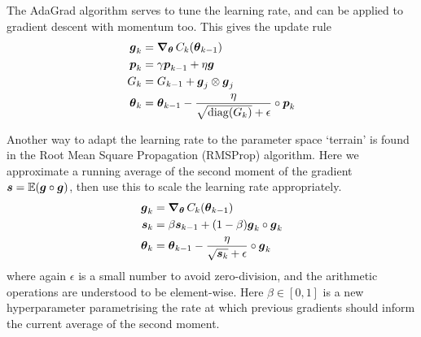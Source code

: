         The AdaGrad algorithm serves to tune the learning rate, and can be applied to gradient descent with momentum too. This gives the update rule
        \begin{subequations}
            \begin{align}
                \boldsymbol{g}_k &= \operatorname{\operatorname{\boldsymbol{\nabla}}_{\boldsymbol{\theta}}} C_k(\boldsymbol{\theta}_{k-1}) \\
                \boldsymbol{p}_k &= \gamma \boldsymbol{p}_{k-1} + \eta \boldsymbol{g} \\
                G_k &= G_{k-1} + \boldsymbol{g}_j \otimes \boldsymbol{g}_j \\
                \boldsymbol{\theta}_k &= \boldsymbol{\theta}_{k-1} - \frac{\eta}{\sqrt{\operatorname{diag}(G_k)}+\epsilon} \circ \boldsymbol{p}_k
            \end{align}
        \end{subequations}

        Another way to adapt the learning rate to the parameter space `terrain' is found in the Root Mean Square Propagation (RMSProp) algorithm. Here we approximate a running average of the second moment of the gradient $\boldsymbol{s} = \operatorname{\mathbb{E}}(\boldsymbol{g} \circ \boldsymbol{g})$, then use this to scale the learning rate appropriately.
        \begin{subequations}
            \begin{align}
                \boldsymbol{g}_k &= \operatorname{\operatorname{\boldsymbol{\nabla}}_{\boldsymbol{\theta}}} C_k(\boldsymbol{\theta}_{k-1}) \\
                \boldsymbol{s}_k &= \beta \boldsymbol{s}_{k-1} + (1-\beta) \boldsymbol{g}_k \circ \boldsymbol{g}_k \\
                \boldsymbol{\theta}_k &= \boldsymbol{\theta}_{k-1} - \frac{\eta}{\sqrt{\boldsymbol{s}_k}+\epsilon} \circ \boldsymbol{g}_k
            \end{align}
        \end{subequations}
        where again $\epsilon$ is a small number to avoid zero-division, and the arithmetic operations are understood to be element-wise. Here $\beta \in [0,1]$ is a new hyperparameter parametrising the rate at which previous gradients should inform the current average of the second moment.

